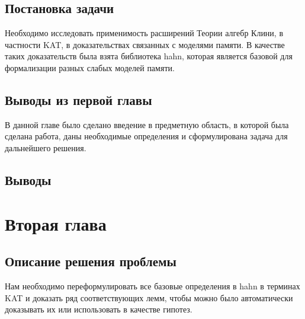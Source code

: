 \documentclass[times
              ]{itmo-student-thesis}
\begin{document}



  \section{Постановка задачи}
    Необходимо исследовать применимость расширений Теории алгебр Клини, в частности KAT, в доказательствах связанных с моделями памяти.
    В качестве таких доказательств была взята библиотека hahn, которая является базовой для формализации разных слабых моделей памяти.

  \section{Выводы из первой главы}
    В данной главе было сделано введение в предметную область, в которой была сделана работа, даны необходимые определения и сформулирована задача для дальнейшего решения.
  \section{Выводы}
 \chapter{Вторая глава}



   \section{Описание решения проблемы}

   Нам необходимо переформулировать все базовые определения в hahn в терминах KAT и доказать ряд соответствующих лемм, чтобы можно было автоматически доказывать их или использовать в качестве гипотез.
\end{document}
